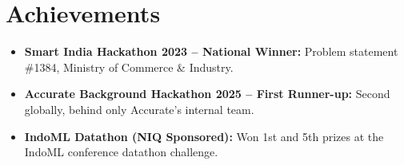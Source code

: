 \documentclass[letterpaper,10pt]{article}
\begin{document}
\section{Achievements}

\begin{itemize}
  \item \textbf{Smart India Hackathon 2023 -- National Winner:} Problem statement \#1384, Ministry of Commerce \& Industry.
  \item \textbf{Accurate Background Hackathon 2025 -- First Runner-up:} Second globally, behind only Accurate's internal team.
  \item \textbf{IndoML Datathon (NIQ Sponsored):} Won 1st and 5th prizes at the IndoML conference datathon challenge.
\end{itemize}
\end{document}
